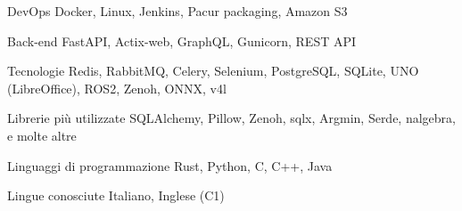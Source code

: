 
\begin{cvskills}

  \cvskill
  {DevOps} %
  {Docker, Linux, Jenkins, Pacur packaging, Amazon S3} %

  \cvskill
  {Back-end} %
  {FastAPI, Actix-web, GraphQL, Gunicorn, REST API} %

  \cvskill
  {Tecnologie} %
  {Redis, RabbitMQ, Celery, Selenium, PostgreSQL, SQLite, UNO
  (LibreOffice), ROS2, Zenoh, ONNX, v4l} %


  \cvskill
  {Librerie più utilizzate} %
  {SQLAlchemy, Pillow, Zenoh, sqlx, Argmin, Serde, nalgebra, e molte altre} %

  \cvskill
  {Linguaggi di programmazione} %
  {Rust, Python, C, C++, Java} %

  \cvskill
  {Lingue conosciute} %
  {Italiano, Inglese (C1)} %

\end{cvskills}
